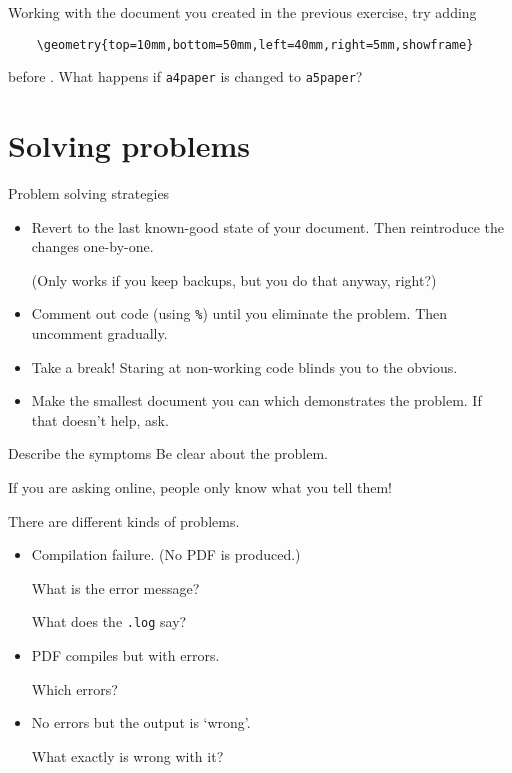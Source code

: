 \begin{exercise}

  Working with the document you created in the previous exercise, try adding
  \begin{verbatim}
    \geometry{top=10mm,bottom=50mm,left=40mm,right=5mm,showframe}
  \end{verbatim}
  before \verb||.
  What happens if \verb|a4paper| is changed to \verb|a5paper|?

\end{exercise}


\section{Solving problems}

\begin{frame}{Problem solving strategies}
	\begin{itemize}
		\item Revert to the last known-good state of your document.
		  Then reintroduce the changes one-by-one.

		  (Only works if you keep backups, but you do that anyway, right?)
		\item Comment out code (using \texttt{\%}) until you eliminate the problem.
		  Then uncomment gradually.
		\item Take a break!
		  Staring at non-working code blinds you to the obvious.
		\item Make the smallest document you can which demonstrates the problem. If that doesn't help, ask.
	\end{itemize}
\end{frame}

\begin{frame}{Describe the symptoms}
	Be clear about the problem.

	If you are asking online, people only know what you tell them!

	There are different kinds of problems.
	\begin{itemize}
		\item Compilation failure.
		  (No PDF is produced.)

		  What is the error message?

		  What does the \texttt{.log} say?
		\item PDF compiles but with errors.

		  Which errors?
		\item No errors but the output is ‘wrong’.

		  What exactly is wrong with it?
	\end{itemize}

\end{frame}

